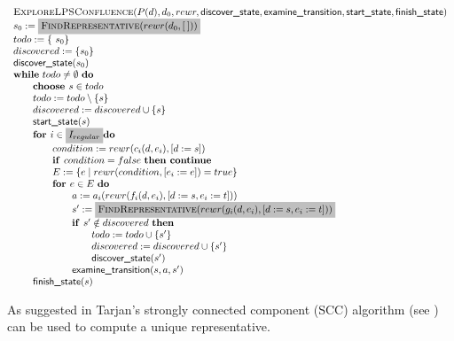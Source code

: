 \documentclass{article}
\newcommand{\Space}{\text{\ }}
\newcommand{\If}{\text{\textbf{if }}}
\newcommand{\Do}{\text{\textbf{do }}}
\newcommand{\Then}{\text{\textbf{then }}}
\newcommand{\For}{\text{\textbf{for }}}
\newcommand{\Continue}{\text{\textbf{continue }}}
\newcommand{\Choose}{\text{\textbf{choose }}}
\begin{document}
\[
\begin{tabular}{l}
\textsc{ExploreLPSConfluence}($P(d), d_0, rewr, \textsf{discover\_state}, \textsf{examine\_transition},
\textsf{start\_state}, \textsf{finish\_state})$ \\
$s_0 := \colorbox{lightgray}{$\textsc{FindRepresentative}(rewr(d_0, [\:]))$}$ \\
$todo := \{\ s_0 \}$ \\
$discovered := \{ s_0 \}$ \\
$\textsf{discover\_state}(s_0)$ \\
\textbf{while} $todo \neq \emptyset $ \Do \\
\qquad \Choose $s \in todo$ \\
\qquad $todo := todo \setminus \{s\}$ \\
\qquad $discovered := discovered \cup \{s\}$ \\
\qquad $\textsf{start\_state}(s)$ \\
\qquad $\For i \in \colorbox{lightgray}{$I_{regular}$} \Do$ \\
\qquad \qquad $condition := rewr(c_i(d, e_i), [d := s])$ \\
\qquad \qquad $\If condition = false  \Space \Then \Continue$ \\
\qquad \qquad $E := \{ e \mid rewr(condition, [e_i := e]) = true \}$ \\
\qquad \qquad $\For e \in E  \Space \Do$ \\
\qquad \qquad \qquad $a := a_i(rewr(f_i(d,e_i), [d:=s,e_i:=t]))$ \\
\qquad \qquad \qquad $s' := \colorbox{lightgray}{$\textsc{FindRepresentative}(rewr(g_i(d,e_i), [d:=s,e_i:=t]))$}$ \\
\qquad \qquad \qquad $\If s' \notin discovered \Space \Then$ \\
\qquad \qquad \qquad \qquad $todo := todo \cup \{ s' \}$ \\
\qquad \qquad \qquad \qquad $discovered := discovered \cup \{s'\}$ \\
\qquad \qquad \qquad \qquad $\textsf{discover\_state}(s')$ \\
\qquad \qquad \qquad $\textsf{examine\_transition}(s, a, s')$ \\
\qquad $\textsf{finish\_state}(s)$
\end{tabular}
\]

As suggested in \cite{DBLP:conf/cav/BlomP02} Tarjan's strongly connected component (SCC) algorithm (see \cite{Tarjan72depthfirst}) can be used to compute a unique representative.
\end{document}
